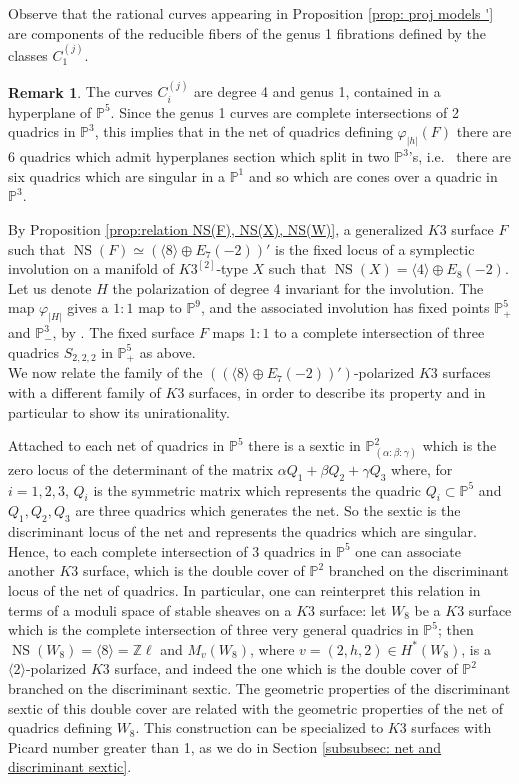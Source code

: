 \documentclass{amsart}
\theoremstyle{definition}
\newtheorem{rem}[thm]{Remark}
\numberwithin{equation}{section}
\numberwithin{equation}{section} \theoremstyle{definition}
\DeclareMathOperator{\NS}{NS}
\newcommand\PP{{\mathbb{P}}}
\newcommand\Z{\mathbb{Z}}
\begin{document}
Observe that the rational curves appearing in Proposition \ref{prop: proj models '} are components of the reducible fibers of the genus 1 fibrations defined by the classes $C_1^{(j)}$.

\begin{rem}\label{rem: singular memebers in the net of quadrics}{\rm The curves $C_i^{(j)}$ are degree 4 and genus 1, contained in a hyperplane of $\mathbb{P}^5$.
Since the genus 1 curves are complete intersections of 2 quadrics in $\mathbb{P}^3$, this implies that in the net of quadrics defining $\varphi_{|h|}(F)$ there are 6 quadrics which admit hyperplanes section which split in two $\mathbb{P}^3$'s, i.e.~ there are six quadrics which are singular in a $\mathbb{P}^1$ and so  which are cones over a quadric in $\mathbb{P}^3$.}
\end{rem}

By Proposition \ref{prop:relation NS(F), NS(X), NS(W)}, a generalized $K3$ surface $F$ such that $\NS(F)\simeq\left(\langle 8\rangle\oplus E_7(-2)\right)'$ is the fixed locus of a symplectic involution on a manifold of $K3^{[2]}$-type $X$ such that $\NS(X)=\langle 4\rangle\oplus E_8(-2)$. Let us denote $H$ the polarization of degree 4 invariant for the involution. The map $\varphi_{|H|}$ gives a $1:1$ map to $\PP^9$, and the associated involution has fixed points $\PP^5_+$ and $\PP^3_-$, by \cite[Section 5A]{CGKK}. The fixed surface $F$ maps $1:1$ to a complete intersection of three quadrics $S_{2,2,2}$ in $\PP^5_+$ as above.\\

We now relate the family of the $\left(\left(\langle 8\rangle\oplus E_7(-2)\right)'\right)$-polarized $K3$ surfaces with a different family of $K3$ surfaces, in order to describe its property and in particular to show its unirationality.


Attached to each net of quadrics in $\mathbb{P}^5$ there is a sextic in $\mathbb{P}^2_{(\alpha:\beta:\gamma)}$ which is the zero locus of the determinant of the matrix $\alpha Q_1+\beta Q_2+\gamma Q_3$ where, for $i=1,2,3$, $Q_i$ is the symmetric matrix which represents the quadric $Q_i\subset\mathbb{P}^5$ and $Q_1,Q_2,Q_3$ are three quadrics which generates the net. So the sextic is the discriminant locus of the net and represents the quadrics which are singular. Hence, to each complete intersection of 3 quadrics in $\mathbb{P}^5$ one can associate another $K3$ surface, which is the double cover of $\mathbb{P}^2$ branched on the discriminant locus of the net of quadrics. In particular, one can reinterpret this relation in terms of a moduli space of stable sheaves on a $K3$ surface: let $W_8$ be a $K3$ surface which is the complete intersection of three very general quadrics in $\mathbb{P}^5$; then $\NS(W_8)=\langle 8\rangle=\Z \ell$ and $M_v(W_8)$, where $v=(2,h,2)\in H^*(W_8)$, is a $\langle 2\rangle$-polarized $K3$ surface, and indeed the one which is the double cover of $\mathbb{P}^2$ branched on the discriminant sextic. The geometric properties of the discriminant sextic of this double cover are related with the geometric properties of the net of quadrics defining $W_8$. This construction can be specialized to $K3$ surfaces with Picard number greater than 1, as we do in Section \ref{subsubsec: net and discriminant sextic}.
\end{document}
